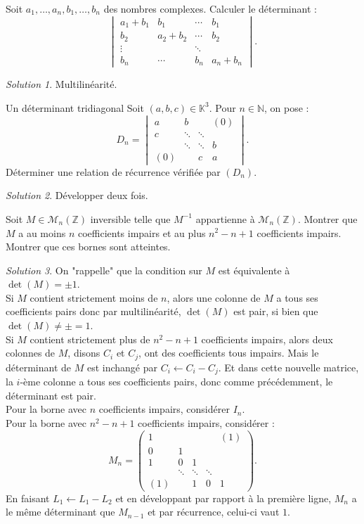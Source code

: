 \documentclass[french]{book}
\newcommand{\N}{\mathbb{N}}
\newcommand{\Z}{\mathbb{Z}}
\newcommand{\K}{\mathbb{K}}
\newcommand{\inv}{^{-1}}
\theoremstyle{definition}
\theoremstyle{remark}
\newtheorem*{sol}{Solution}
\begin{document}
\begin{exo}[0]{}
	Soit $a_1,\ldots,a_n,b_1,\ldots,b_n$ des nombres complexes. Calculer le déterminant : $$\begin{vmatrix}
		a_1+b_1&b_1&\cdots&b_1\\
		b_2&a_2+b_2&\cdots&b_2\\
		\vdots&&\ddots&\\
		b_n&\cdots&b_n&a_n+b_n
	\end{vmatrix}.$$
\end{exo}
\begin{sol}
	Multilinéarité.
\end{sol}

\begin{exo}[0]{Un déterminant tridiagonal}
	Soit $(a,b,c)\in\K^3$. Pour $n\in\N$, on pose : $$D_n=\displaystyle\begin{vmatrix}
		a&b&&(0)\\
		c&\ddots&\ddots&\\
		&\ddots&\ddots&b\\
		(0)&&c&a
	\end{vmatrix}.$$ Déterminer une relation de récurrence vérifiée par $(D_n)$.
\end{exo}
\begin{sol}
	Développer deux fois.
\end{sol}

\begin{exo}[1]{}
	Soit $M\in\mathcal{M}_n(\Z)$ inversible telle que $M\inv$ appartienne à $\mathcal{M}_n(\Z)$. Montrer que $M$ a au moins $n$ coefficients impairs et au plus $n^2-n+1$ coefficients impairs. Montrer que ces bornes sont atteintes.
\end{exo}
\begin{sol}
	On "rappelle" que la condition sur $M$ est équivalente à $\det(M)=\pm1$.\\
	Si $M$ contient strictement moins de $n$, alors une colonne de $M$ a tous ses coefficients pairs donc par multilinéarité, $\det(M)$ est pair, si bien que $\det(M)\ne\pm=1$.\\
	Si $M$ contient strictement plus de $n^2-n+1$ coefficients impairs, alors deux colonnes de $M$, disons $C_i$ et $C_j$, ont des coefficients tous impairs. Mais le déterminant de $M$ est inchangé par $C_i\leftarrow C_i-C_j$. Et dans cette nouvelle matrice, la $i$-ème colonne a tous ses coefficients pairs, donc comme précédemment, le déterminant est pair.\\
	Pour la borne avec $n$ coefficients impairs, considérer $I_n$.\\
	Pour la borne avec $n^2-n+1$ coefficients impairs, considérer :
	$$M_n=\begin{pmatrix}
		1&&&&(1)\\
		0&1&&&\\
		1&0&1&&\\
		&\ddots&\ddots&\ddots&\\
		(1)&&1&0&1
	\end{pmatrix}.$$
	En faisant $L_1\leftarrow L_1-L_2$ et en développant par rapport à la première ligne, $M_n$ a le même déterminant que $M_{n-1}$ et par récurrence, celui-ci vaut $1$.
\end{sol}
\end{document}
